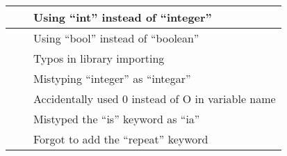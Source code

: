 \begin{table}[]
\begin{tabular}{| p{5cm} | p{5cm} | p{5cm} |}
                                                           &                                                                    & Using “int” instead of “integer”                                                                         \\ \hline
                                                           &                                                                    & Using “bool” instead of “boolean”                                                                        \\ \hline
                                                           &                                                                    & Typos in library importing                                                                               \\ \hline
                                                           &                                                                    & Mistyping “integer” as “integar”                                                                         \\ \hline
                                                           &                                                                    & Accidentally used 0 instead of O in variable name                                                        \\ \hline
                                                           &                                                                    & Mistyped the “is” keyword as “ia”                                                                        \\ \hline
                                                           &                                                                    & Forgot to add the “repeat” keyword                                                                       \\ \hline
\end{tabular}
\end{table}

